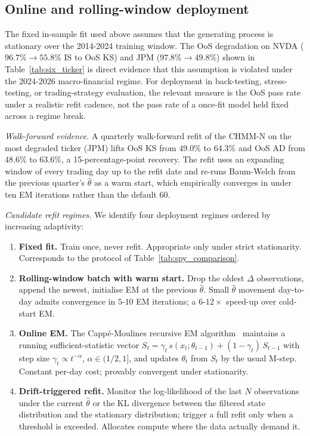 \documentclass[sigconf,anonymous,nonacm=true]{acmart}
\begin{document}
\subsection{Online and rolling-window deployment}
\label{sec:online}

The fixed in-sample fit used above assumes that the generating process
is stationary over the 2014-2024 training window. The OoS degradation
on NVDA ($96.7\% \to 55.8\%$ IS to OoS KS) and JPM ($97.8\% \to 49.8\%$)
shown in Table~\ref{tab:six_ticker} is direct evidence that this
assumption is violated under the 2024-2026 macro-financial regime. For
deployment in back-testing, stress-testing, or trading-strategy
evaluation, the relevant measure is the OoS pass rate under a realistic
refit cadence, not the pass rate of a once-fit model held fixed across
a regime break.

\emph{Walk-forward evidence.} A quarterly walk-forward refit of the
CHMM-N on the most degraded ticker (JPM) lifts OoS KS from
$49.0\%$ to $64.3\%$ and OoS AD from $48.6\%$ to $63.6\%$, a
15-percentage-point recovery. The refit uses an expanding window of
every trading day up to the refit date and re-runs Baum-Welch from the
previous quarter's $\hat\theta$ as a warm start, which empirically
converges in under ten EM iterations rather than the default 60.

\emph{Candidate refit regimes.} We identify four deployment regimes
ordered by increasing adaptivity:
\begin{enumerate}
  \item \textbf{Fixed fit.} Train once, never refit. Appropriate only
    under strict stationarity. Corresponds to the protocol of
    Table~\ref{tab:spy_comparison}.
  \item \textbf{Rolling-window batch with warm start.} Drop the oldest
    $\Delta$ observations, append the newest, initialise EM at the
    previous $\hat\theta$. Small $\hat\theta$ movement day-to-day
    admits convergence in $5\text{-}10$ EM iterations; a $6\text{-}12
    \times$ speed-up over cold-start EM.
  \item \textbf{Online EM.} The Capp\'e-Moulines recursive EM
    algorithm~\cite{cappe2011online,cappe2009onlineem} maintains a
    running sufficient-statistic vector
    $S_t = \gamma_t\, s(x_t;\theta_{t-1}) + (1 - \gamma_t)\, S_{t-1}$
    with step size $\gamma_t \propto t^{-\alpha}$, $\alpha \in (1/2, 1]$,
    and updates $\theta_t$ from $S_t$ by the usual M-step. Constant
    per-day cost; provably convergent under stationarity.
  \item \textbf{Drift-triggered refit.} Monitor the log-likelihood of
    the last $N$ observations under the current $\hat\theta$ or the
    KL divergence between the filtered state distribution and the
    stationary distribution; trigger a full refit only when a threshold
    is exceeded. Allocates compute where the data actually demand it.
\end{enumerate}
\end{document}
